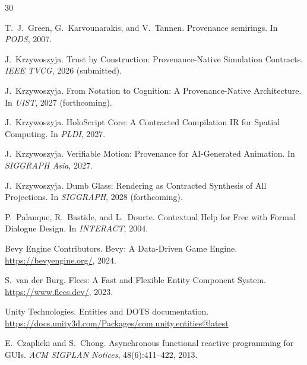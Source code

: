 \documentclass[sigconf,nonacm]{acmart}
\begin{document}
\iffalse
\begin{thebibliography}{30}

T.~J.~Green, G.~Karvounarakis, and V.~Tannen.
\newblock Provenance semirings.
\newblock In \emph{PODS}, 2007.

J.~Krzywoszyja.
\newblock Trust by Construction: Provenance-Native Simulation Contracts.
\newblock \emph{IEEE TVCG}, 2026 (submitted).

J.~Krzywoszyja.
\newblock From Notation to Cognition: A Provenance-Native Architecture.
\newblock In \emph{UIST}, 2027 (forthcoming).

J.~Krzywoszyja.
\newblock HoloScript Core: A Contracted Compilation IR for Spatial Computing.
\newblock In \emph{PLDI}, 2027.

J.~Krzywoszyja.
\newblock Verifiable Motion: Provenance for AI-Generated Animation.
\newblock In \emph{SIGGRAPH Asia}, 2027.

J.~Krzywoszyja.
\newblock Dumb Glass: Rendering as Contracted Synthesis of All Projections.
\newblock In \emph{SIGGRAPH}, 2028 (forthcoming).

P.~Palanque, R.~Bastide, and L.~Dourte.
\newblock Contextual Help for Free with Formal Dialogue Design.
\newblock In \emph{INTERACT}, 2004.

Bevy Engine Contributors.
\newblock Bevy: A Data-Driven Game Engine.
\newblock \url{https://bevyengine.org/}, 2024.

S.~van der Burg.
\newblock Flecs: A Fast and Flexible Entity Component System.
\newblock \url{https://www.flecs.dev/}, 2023.

Unity Technologies.
\newblock Entities and DOTS documentation.
\newblock \url{https://docs.unity3d.com/Packages/com.unity.entities@latest}

E.~Czaplicki and S.~Chong.
\newblock Asynchronous functional reactive programming for GUIs.
\newblock \emph{ACM SIGPLAN Notices}, 48(6):411--422, 2013.


\end{thebibliography}
\end{document}
